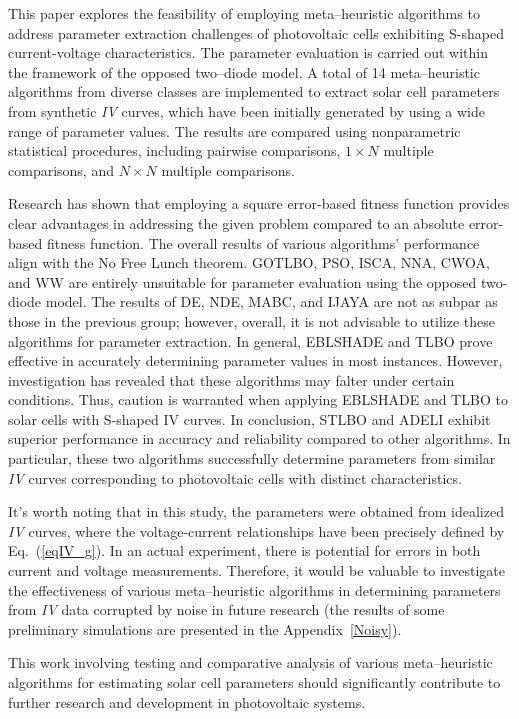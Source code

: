 \documentclass[a4paper,fleqn]{cas-sc}
\begin{document}
This paper explores the feasibility of employing meta--heuristic algorithms
to address parameter extraction challenges of photovoltaic cells
exhibiting S-shaped current-voltage characteristics.
The parameter evaluation is carried out within the framework of the opposed two--diode model.
A total of 14 meta--heuristic algorithms from diverse classes are implemented
to extract solar cell parameters from synthetic \emph{IV} curves,
which have been initially generated by using a wide range of parameter values.
The results are compared using nonparametric statistical procedures,
including pairwise comparisons,  $1\times N$ multiple comparisons, and $N\times N$ multiple comparisons.

Research has shown that employing
a square error-based fitness function provides
clear advantages in addressing the given problem compared to
an absolute error-based fitness function.
The overall results of various algorithms' performance align with the No Free Lunch theorem.
GOTLBO, PSO, ISCA, NNA, CWOA, and WW are entirely unsuitable for parameter evaluation using the opposed two-diode model.
The results of DE, NDE, MABC, and IJAYA are not as subpar as those in the previous group;
however, overall, it is not advisable to utilize these algorithms for parameter extraction.
In general, EBLSHADE and TLBO prove effective in accurately determining parameter values in most instances.
However, investigation has revealed that these algorithms may falter under certain conditions.
Thus, caution is warranted when applying EBLSHADE and TLBO to solar cells with S-shaped IV curves.
In conclusion, STLBO and ADELI exhibit superior performance in accuracy and reliability compared to other algorithms.
In particular, these two algorithms successfully determine parameters from similar \emph{IV} curves corresponding to photovoltaic cells with distinct characteristics.


It's worth noting that in this study,
the parameters were obtained from idealized \emph{IV} curves,
where the voltage-current relationships have been precisely defined by Eq.~(\ref{eqIV_g}).
In an actual experiment, there is potential for errors in both current and voltage measurements.
Therefore, it would be valuable to investigate the effectiveness of various meta--heuristic algorithms
in determining parameters from \emph{IV} data corrupted by noise in future research 
(the results of some preliminary simulations are presented in the Appendix~\ref{Noisy}).


This work involving testing and comparative analysis of various meta--heuristic
algorithms for estimating solar cell parameters should significantly contribute
to further research and development in photovoltaic systems.
\end{document}
